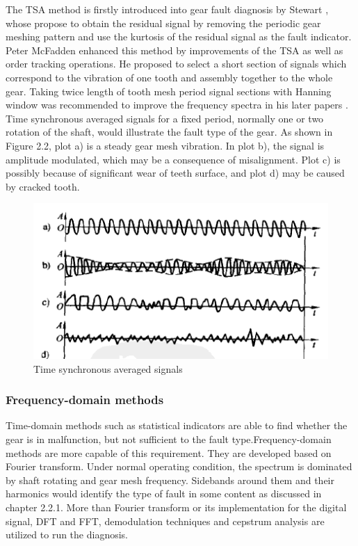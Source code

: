 The TSA method is firstly introduced into gear fault diagnosis by Stewart \cite{stewart}, whose propose to obtain the residual signal by removing the periodic gear meshing pattern and use the kurtosis of the residual signal as the fault indicator. Peter McFadden \cite{mc2} enhanced this method by improvements of the TSA as well as order tracking operations. He proposed to select a short section of signals which correspond to the vibration of one tooth and assembly together to the whole gear. Taking twice length of tooth mesh period signal sections with Hanning window was recommended to improve the frequency spectra in his later papers \cite{mc3}. Time synchronous averaged signals for a fixed period, normally one or two rotation of the shaft, would illustrate the fault type of the gear. As shown in Figure 2.2, plot a) is a steady gear mesh vibration. In plot b), the signal is amplitude modulated, which may be a consequence of misalignment. Plot c) is possibly because of significant wear of teeth surface, and plot d) may be caused by cracked tooth.

\begin{figure}
	\centering
	\includegraphics{TSA}
	\caption{Time synchronous averaged signals \cite{chen}}
	\label{tsa}
\end{figure}


\subsubsection{Frequency-domain methods}

Time-domain methods such as statistical indicators are able to find whether the gear is in malfunction, but not sufficient to the fault type.Frequency-domain methods are more capable of this requirement. They are developed based on Fourier transform. Under normal operating condition, the spectrum is dominated by shaft rotating and gear mesh frequency. Sidebands around them and their harmonics would identify the type of fault in some content as discussed in chapter 2.2.1.
More than Fourier transform or its implementation for the digital signal, DFT and FFT, demodulation techniques and cepstrum analysis are utilized to run the diagnosis.

